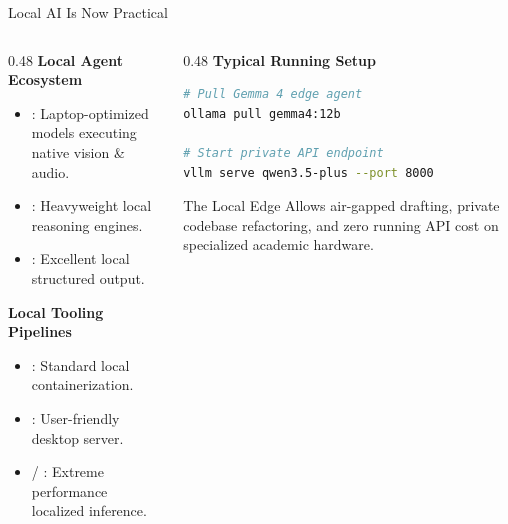 \begin{frame}[fragile]{Local AI Is Now Practical}
  \begin{columns}[T, onlytextwidth]
    \begin{column}{0.48\textwidth}
      \textbf{Local Agent Ecosystem}
      \begin{itemize}
        \item {}: Laptop-optimized models executing native vision \& audio.
        \item {}: Heavyweight local reasoning engines.
        \item {}: Excellent local structured output.
      \end{itemize}
      \vspace{0.4em}
      \textbf{Local Tooling Pipelines}
      \begin{itemize}
        \item {}: Standard local containerization.
        \item {}: User-friendly desktop server.
        \item {} / : Extreme performance localized inference.
      \end{itemize}
    \end{column}
    \hfill
    \begin{column}{0.48\textwidth}
      \textbf{Typical Running Setup}
      \begin{lstlisting}[language=bash, numbers=none, basicstyle=\ttfamily\tiny]
# Pull Gemma 4 edge agent
ollama pull gemma4:12b

# Start private API endpoint
vllm serve qwen3.5-plus --port 8000
      \end{lstlisting}
      \vspace{0.3em}
      \begin{block}{The Local Edge}
        Allows air-gapped drafting, private codebase refactoring, and zero running API cost on specialized academic hardware.
      \end{block}
    \end{column}
  \end{columns}
\end{frame}

